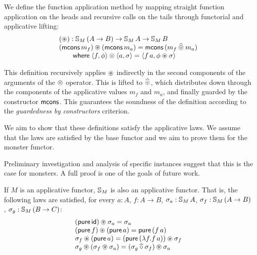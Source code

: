We define the function application method by mapping straight function application on the heads and recursive calls on the tails through functorial and applicative lifting:
$$
\begin{array}{l}
(\circledast) : \mathbb{S}_{M}\,(A\rightarrow B) \rightarrow \mathbb{S}_{M}\,A \rightarrow \mathbb{S}_{M}\,B\\
(\mathsf{mcons}\,m_f) \circledast (\mathsf{mcons}\,m_a)
= \mathsf{mcons}\,(m_f \mathbin{\widehat{\circledcirc}} m_a)\\
\qquad \mathsf{where}\;
\langle f,\phi\rangle \circledcirc \langle a,\sigma\rangle 
= \langle f\,a, \phi \circledast \sigma \rangle
\end{array}
$$

This definition recursively applies $\circledast$ indirectly in the second components of the arguments of the $\circledcirc$ operator.
This is lifted to $\mathbin{\widehat{\circledcirc}}$, which distributes down through the components of the applicative values $m_f$ and $m_a$, and finally guarded by the constructor $\mathsf{mcons}$.
This guarantees the soundness of the definition according to the {\em guardedness by constructors} criterion.

We aim to show that these definitions satisfy the applicative laws.
We assume that the laws are satisfied by the base functor and we aim to prove them for the monster functor.

Preliminary investigation and analysis of specific instances suggest that this is the case for monsters.
A full proof is one of the goals of future work.
\begin{conjecture}\label{lemma:appl_laws}
If $M$ is an applicative functor, $\mathbb{S}_{M}$ is also an applicative functor.
That is, the following laws are satisfied, for every $a:A$, $f:A\rightarrow B$, $\sigma_a:\mathbb{S}_{M}\,A$, $\sigma_f : \mathbb{S}_{M}\,(A\rightarrow B)$, $\sigma_g: \mathbb{S}_{M}\,(B\rightarrow C)$:
$$
\begin{array}{l}
(\mathsf{pure}\,\mathsf{id}) \circledast \sigma_a = \sigma_a \\
(\mathsf{pure}\,f) \circledast (\mathsf{pure}\,a) = \mathsf{pure}\,(f\,a) \\
\sigma_f \circledast (\mathsf{pure}\,a) = (\mathsf{pure}\,(\lambda f. f\,a)) \circledast \sigma_f \\
\sigma_g \circledast (\sigma_f \circledast \sigma_a) = (\sigma_g \mathbin{\widehat{\circ}} \sigma_f) \circledast \sigma_a
\end{array}
$$
\end{conjecture}

